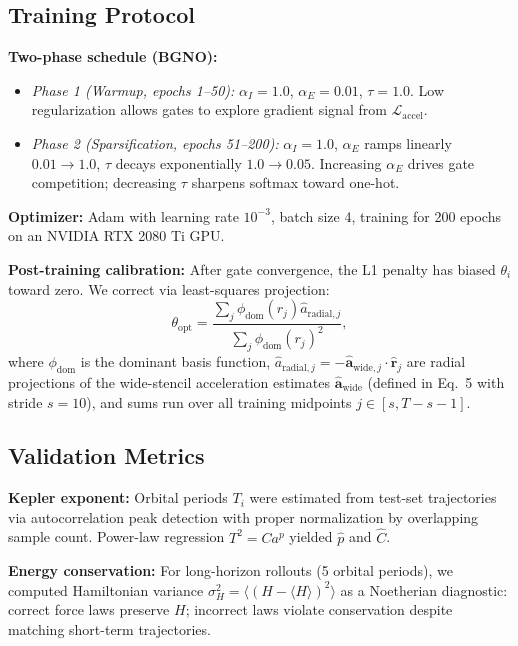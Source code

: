 \documentclass[9pt,twocolumn,twoside]{pnas-new}
\begin{document}
\subsection*{Training Protocol}
\textbf{Two-phase schedule (BGNO):}
\begin{itemize}
\item \textit{Phase 1 (Warmup, epochs 1--50):} $\alpha_I = 1.0$, $\alpha_E = 0.01$, $\tau = 1.0$. Low regularization allows gates to explore gradient signal from $\mathcal{L}_{\text{accel}}$.
\item \textit{Phase 2 (Sparsification, epochs 51--200):} $\alpha_I = 1.0$, $\alpha_E$ ramps linearly $0.01 \to 1.0$, $\tau$ decays exponentially $1.0 \to 0.05$. Increasing $\alpha_E$ drives gate competition; decreasing $\tau$ sharpens softmax toward one-hot.
\end{itemize}

\textbf{Optimizer:} Adam with learning rate $10^{-3}$, batch size 4, training for 200 epochs on an NVIDIA RTX 2080 Ti GPU.

\textbf{Post-training calibration:} After gate convergence, the L1 penalty has biased $\theta_i$ toward zero. We correct via least-squares projection:
\begin{equation}
\theta_{\text{opt}} = \frac{\sum_j \phi_{\text{dom}}(r_j) \hat{a}_{\text{radial},j}}{\sum_j \phi_{\text{dom}}(r_j)^2},
\end{equation}
where $\phi_{\text{dom}}$ is the dominant basis function, $\hat{a}_{\text{radial},j} = -\hat{\mathbf{a}}_{\text{wide},j} \cdot \hat{\mathbf{r}}_j$ are radial projections of the wide-stencil acceleration estimates $\hat{\mathbf{a}}_{\text{wide}}$ (defined in Eq.~5 with stride $s=10$), and sums run over all training midpoints $j \in [s, T-s-1]$.

\subsection*{Validation Metrics}
\textbf{Kepler exponent:} Orbital periods $T_i$ were estimated from test-set trajectories via autocorrelation peak detection with proper normalization by overlapping sample count. Power-law regression $T^2 = C a^p$ yielded $\hat{p}$ and $\hat{C}$.

\textbf{Energy conservation:} For long-horizon rollouts (5 orbital periods), we computed Hamiltonian variance $\sigma_H^2 = \langle (H - \langle H \rangle)^2 \rangle$ as a Noetherian diagnostic: correct force laws preserve $H$; incorrect laws violate conservation despite matching short-term trajectories.
\end{document}
